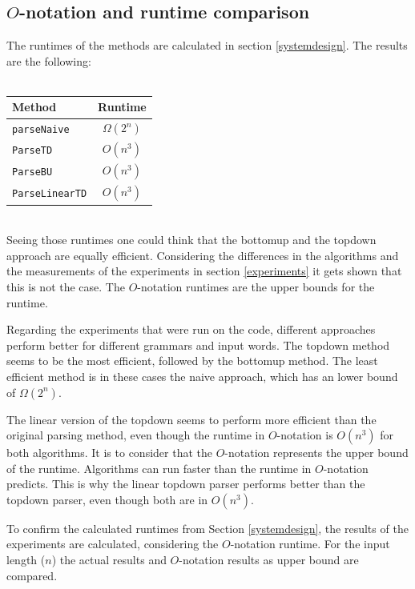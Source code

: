 \documentclass[a4paper, 11pt]{article}
\begin{document}



\subsection{$O$-notation and runtime comparison}
\label{runtime}


The runtimes of the methods are calculated in section \ref{systemdesign}. The results are the following:
\ \\ \\
\begin{tabular}{|l|c|}
\hline
Method & Runtime \\
\hline
\texttt{parseNaive} & $\Omega(2^n)$\\
\texttt{ParseTD} & $O(n^3)$ \\
\texttt{ParseBU} & $O(n^3)$\\
\texttt{ParseLinearTD} & $O(n^3)$\\
\hline
\end{tabular}

\ \\
Seeing those runtimes one could think that the bottomup and the topdown approach are equally efficient. Considering the differences in the algorithms and the measurements of the experiments in section \ref{experiments} it gets shown that this is not the case. The $O$-notation runtimes are the upper bounds for the runtime. 

Regarding the experiments that were run on the code, different approaches perform better for different grammars and input words. The topdown method seems to be the most efficient, followed by the bottomup method. The least efficient method is in these cases the naive approach, which has an lower bound of $\Omega(2^n)$.

The linear version of the topdown seems to perform more efficient than the original parsing method, even though the runtime in $O$-notation is $O(n^3)$ for both algorithms. 
It is to consider that the $O$-notation represents the upper bound of the runtime. Algorithms can run faster than the runtime in $O$-notation predicts. This is why the linear topdown parser performs better than the topdown parser, even though both are in $O(n^3)$.

To confirm the calculated runtimes from Section \ref{systemdesign}, the results of the experiments are calculated, considering the $O$-notation runtime. For the input length ($n$) the actual results and $O$-notation results as upper bound are compared.
\end{document}
